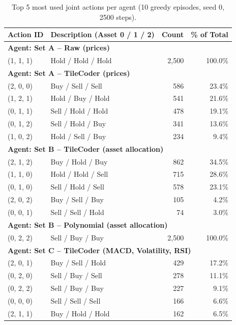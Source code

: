 \documentclass[pdflatex,sn-mathphys-num]{sn-jnl}
\begin{document}
\begin{table}[htbp]
  \centering
  \caption{Top 5 most used joint actions per agent (10 greedy episodes, seed 0, 2500 steps).}
  \label{tab:top_actions}
  \begin{tabular}{llrr}
    \toprule
    \textbf{Action ID} & \textbf{Description (Asset 0 / 1 / 2)} & \textbf{Count} & \textbf{\% of Total} \\
    \midrule
    \multicolumn{4}{l}{\textbf{Agent: Set A -- Raw (prices)}} \\
    (1, 1, 1) & Hold / Hold / Hold & 2,500 & 100.0\% \\
    \midrule
    \multicolumn{4}{l}{\textbf{Agent: Set A -- TileCoder (prices)}} \\
    (2, 0, 0) & Buy / Sell / Sell & 586 & 23.4\% \\
    (1, 2, 1) & Hold / Buy / Hold & 541 & 21.6\% \\
    (0, 1, 1) & Sell / Hold / Hold & 478 & 19.1\% \\
    (0, 1, 2) & Sell / Hold / Buy & 341 & 13.6\% \\
    (1, 0, 2) & Hold / Sell / Buy & 234 & 9.4\% \\
    \midrule
    \multicolumn{4}{l}{\textbf{Agent: Set B -- TileCoder (asset allocation)}} \\
    (2, 1, 2) & Buy / Hold / Buy & 862 & 34.5\% \\
    (1, 1, 0) & Hold / Hold / Sell & 715 & 28.6\% \\
    (0, 1, 0) & Sell / Hold / Sell & 578 & 23.1\% \\
    (2, 0, 2) & Buy / Sell / Buy & 105 & 4.2\% \\
    (0, 0, 1) & Sell / Sell / Hold & 74 & 3.0\% \\
    \midrule
    \multicolumn{4}{l}{\textbf{Agent: Set B -- Polynomial (asset allocation)}} \\
    (0, 2, 2) & Sell / Buy / Buy & 2,500 & 100.0\% \\
    \midrule
    \multicolumn{4}{l}{\textbf{Agent: Set C -- TileCoder (MACD, Volatility, RSI)}} \\
    (2, 0, 1) & Buy / Sell / Hold & 429 & 17.2\% \\
    (0, 2, 0) & Sell / Buy / Sell & 278 & 11.1\% \\
    (0, 2, 2) & Sell / Buy / Buy & 227 & 9.1\% \\
    (0, 0, 0) & Sell / Sell / Sell & 166 & 6.6\% \\
    (2, 1, 1) & Buy / Hold / Hold & 162 & 6.5\% \\

\end{tabular}
\end{table}
\end{document}
